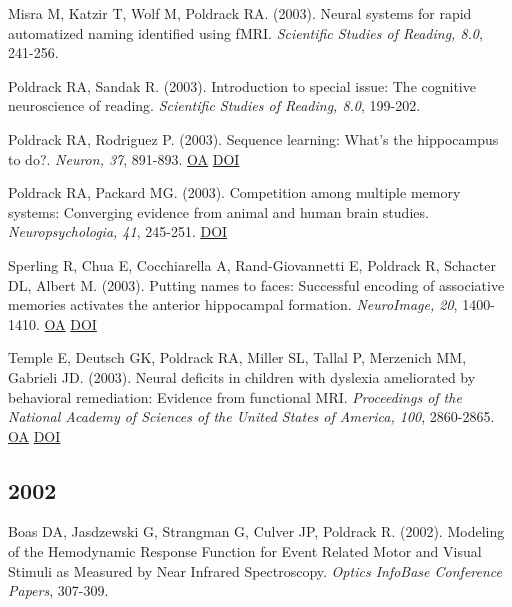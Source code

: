 \documentclass[10pt, letterpaper]{article}
\begin{document}
Misra M, Katzir T, Wolf M, Poldrack RA.  (2003). Neural systems for rapid automatized naming identified using fMRI. \textit{Scientific Studies of Reading, 8.0}, 241-256. \vspace{2mm}

Poldrack RA, Sandak R.  (2003). Introduction to special issue: The cognitive neuroscience of reading. \textit{Scientific Studies of Reading, 8.0}, 199-202. \vspace{2mm}

Poldrack RA, Rodriguez P.  (2003). Sequence learning: What's the hippocampus to do?. \textit{Neuron, 37}, 891-893. \href{https://doi.org/10.1016/s0896-6273(03)00159-4}{OA} \href{https://doi.org/10.1016/s0896-6273(03)00159-4}{DOI} \vspace{2mm}

Poldrack RA, Packard MG.  (2003). Competition among multiple memory systems: Converging evidence from animal and human brain studies. \textit{Neuropsychologia, 41}, 245-251. \href{https://doi.org/10.1016/s0028-3932(02)00157-4}{DOI} \vspace{2mm}

Sperling R, Chua E, Cocchiarella A, Rand-Giovannetti E, Poldrack R, Schacter DL, Albert M.  (2003). Putting names to faces: Successful encoding of associative memories activates the anterior hippocampal formation. \textit{NeuroImage, 20}, 1400-1410. \href{https://www.ncbi.nlm.nih.gov/pmc/articles/PMC3230827}{OA} \href{https://doi.org/10.1016/s1053-8119(03)00391-4}{DOI} \vspace{2mm}

Temple E, Deutsch GK, Poldrack RA, Miller SL, Tallal P, Merzenich MM, Gabrieli JD.  (2003). Neural deficits in children with dyslexia ameliorated by behavioral remediation: Evidence from functional MRI. \textit{Proceedings of the National Academy of Sciences of the United States of America, 100}, 2860-2865. \href{https://www.ncbi.nlm.nih.gov/pmc/articles/PMC151431}{OA} \href{https://doi.org/10.1073/pnas.0030098100}{DOI} \vspace{2mm}

\subsection*{2002}Boas DA, Jasdzewski G, Strangman G, Culver JP, Poldrack R.  (2002). Modeling of the Hemodynamic Response Function for Event Related Motor and Visual Stimuli as Measured by Near Infrared Spectroscopy. \textit{Optics InfoBase Conference Papers}, 307-309. \vspace{2mm}
\end{document}
